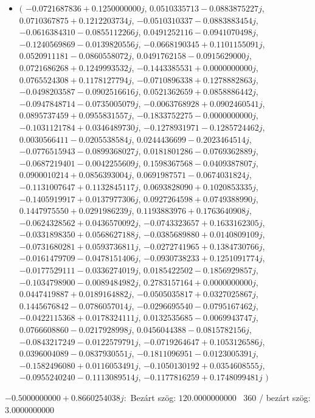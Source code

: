 \documentclass[14pt,a4paper]{article}
\begin{document}
\begin{itemize}
\item
$\big($
$-0.0721687836+0.1250000000j$, $0.0510335713-0.0883875227j$, $0.0710367875+0.1212203734j$, $-0.0510310337-0.0883883454j$, $-0.0616384310-0.0855112266j$, $0.0491252116-0.0941070498j$, $-0.1240569869-0.0139820556j$, $-0.0668190345+0.1101155091j$, $0.0520911181-0.0860558072j$, $0.0491762158-0.0915629000j$, $0.0721686268+0.1249993532j$, $-0.1443385531+0.0000000000j$, $0.0765524308+0.1178127794j$, $-0.0710896338+0.1278882863j$, $-0.0498203587-0.0902516616j$, $0.0521362659+0.0858886442j$, $-0.0947848714-0.0735005079j$, $-0.0063768928+0.0902460541j$, $0.0895737459+0.0955831557j$, $-0.1833752275-0.0000000000j$, $-0.1031121784+0.0346489730j$, $-0.1278931971-0.1285724462j$, $0.0030566411-0.0205538584j$, $0.0244436699-0.2023464514j$, $-0.0776515943-0.0899368027j$, $0.0181801286-0.0769362889j$, $-0.0687219401-0.0042255609j$, $0.1598367568-0.0409387807j$, $0.0900010214+0.0856393004j$, $0.0691987571-0.0674031824j$, $-0.1131007647+0.1132845117j$, $0.0693828090+0.1020853335j$, $-0.1405919917+0.0137977306j$, $0.0927264598+0.0749388990j$, $0.1447975550+0.0291986239j$, $0.1193883976+0.1763640908j$, $-0.0624328562+0.0436570092j$, $-0.0743323657+0.1633162305j$, $-0.0331898350+0.0568627188j$, $-0.0385689880+0.0140809109j$, $-0.0731680281+0.0593736811j$, $-0.0272741965+0.1384730766j$, $-0.0161479709-0.0478151406j$, $-0.0930738233+0.1251091774j$, $-0.0177529111-0.0336274019j$, $0.0185422502-0.1856929857j$, $-0.1034798900-0.0089484982j$, $0.2783157164+0.0000000000j$, $0.0447419887+0.0189164882j$, $-0.0505035817+0.0327025867j$, $0.1445676842-0.0786057014j$, $-0.0296695540-0.0795167462j$, $-0.0422115368+0.0178324111j$, $0.0132535685-0.0069943747j$, $0.0766608860-0.0217928998j$, $0.0456044388-0.0815782156j$, $-0.0843217249-0.0122579791j$, $-0.0719264647+0.1053126586j$, $0.0396004089-0.0837930551j$, $-0.1811096951-0.0123005391j$, $-0.1582496080+0.0116053491j$, $-0.1050130192+0.0354608555j$, $-0.0955240240-0.1113089514j$, $-0.1177816259+0.1748099481j$
$\big)$
\end{itemize}
$-0.5000000000+0.8660254038j$:\
Bezárt szög: $120.0000000000$ \
360 / bezárt szög: $3.0000000000$\
\end{document}
